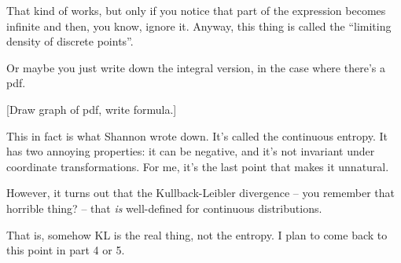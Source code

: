 \documentclass[11pt]{article}
\begin{document}
That kind of works, but only if you notice that part of the expression becomes
infinite and then, you know, ignore it. Anyway, this thing is called the
``limiting density of discrete points''.

Or maybe you just write down the integral version, in the case where there's a pdf.

[Draw graph of pdf, write formula.]

This in fact is what Shannon wrote down. It's called the continuous entropy. It
has two annoying properties: it can be negative, and it's not invariant under
coordinate transformations. For me, it's the last point that makes it unnatural.

However, it turns out that the Kullback-Leibler divergence -- you remember that
horrible thing? -- that \emph{is} well-defined for continuous distributions.

That is, somehow KL is the real thing, not the entropy. I plan to come back to
this point in part 4 or 5.
\end{document}
